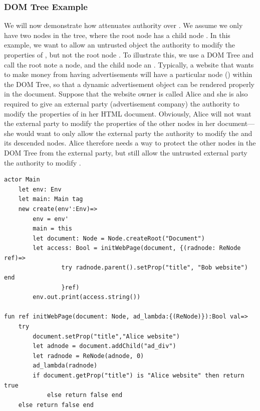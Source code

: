 \documentclass[a4paper,11pt,twoside]{article}
\begin{document}
\subsubsection{DOM Tree Example}\label{domexample}
We will now demonstrate how  attenuates authority over . We assume we only have two nodes in the tree, where the root node  has a child node . In this example, we want to allow an untrusted object  the authority to modify the properties of , but not the root node . To illustrate this, we use a DOM Tree and call the root note  a  node, and the child node  an .  Typically, a website that wants to make money from having advertisements will have a particular node () within the DOM Tree, so that a dynamic advertisement object can be rendered properly in the document. Suppose that the website owner is called Alice and she is also required to give an external party (advertisement company) the authority to modify the properties of  in her HTML document. Obviously, Alice will not want the external party to modify the properties of the other nodes in her document---she would want to only allow the external party the authority to modify the  and its descended nodes. Alice therefore needs a way to protect the other nodes in the DOM Tree from the external party, but still allow the untrusted external party the authority to modify .\\
\begin{lstlisting}
actor Main
    let env: Env
    let main: Main tag
    new create(env':Env)=>
        env = env'
        main = this
        let document: Node = Node.createRoot("Document")
        let access: Bool = initWebPage(document, {(radnode: ReNode ref)=>
                try radnode.parent().setProp("title", "Bob website") end 
                }ref)
        env.out.print(access.string())
         
fun ref initWebPage(document: Node, ad_lambda:{(ReNode)}):Bool val=>
    try
        document.setProp("title","Alice website")
        let adnode = document.addChild("ad_div")
        let radnode = ReNode(adnode, 0)
        ad_lambda(radnode)
        if document.getProp("title") is "Alice website" then return true
            else return false end
    else return false end
\end{lstlisting}
\end{document}
